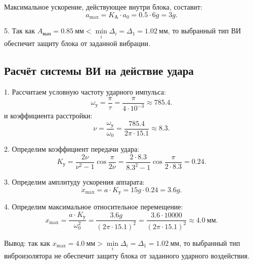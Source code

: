 Максимальное ускорение, действующее внутри блока, составит:
\[
    a_{\max} = K_{А} \cdot a_0
    = 0.5 \cdot 6g
    = 3g.
\]

5. Так как $A_{вын} = 0.85~мм < \min\limits_i \Delta_i = \Delta_1 = 1.02~мм$, то выбранный тип ВИ обеспечит защиту блока от заданной вибрации.

\subsection{Расчёт системы ВИ на действие удара}
1. Рассчитаем условную частоту ударного импульса:
\[
    \omega_{у}
    = \frac{\pi}{\tau}
    = \frac{\pi}{4 \cdot 10^{-3}}
    \approx 785.4.
\]
и коэффициента расстройки:
\[
    \nu
    = \frac{\omega_{у}}{\omega_0}
    = \frac{785.4}{2 \pi \cdot 15.1}
    \approx 8.3.
\]

2. Определим коэффициент передачи удара:
\[
    K_{у}
    = \frac{2 \nu}{\nu^2 - 1} \cos \frac{\pi}{2 \nu}
    = \frac{2 \cdot 8.3}{8.3^2 - 1} \cos \frac{\pi}{2 \cdot 8.3}
    = 0.24.
\]

3. Определим амплитуду ускорения аппарата:
\[
    \ddot{x}_{\max}
    = a \cdot K_{у}
    = 15 g \cdot 0.24
    = 3.6 g.
\]

4. Определим максимальное относительное перемещение:
\[
    x_{\max}
    = \frac{a \cdot K_{у}}{\omega_0^2}
    = \frac{3.6 g}{\left(2 \pi \cdot 15.1\right)^2}
    = \frac{3.6 \cdot 10000}{\left(2 \pi \cdot 15.1\right)^2}
    \approx 4.0~мм.
\]

Вывод: так как $x_{\max} = 4.0~мм > \min\limits_i \Delta_i = \Delta_1 = 1.02~мм$, то выбранный тип виброизолятора не обеспечит защиту блока от заданного ударного воздействия.
